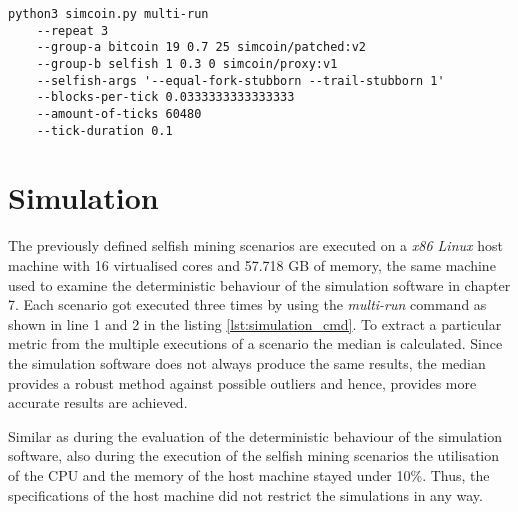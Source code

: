 \begin{minipage}{\linewidth}
\begin{lstlisting}[caption=Command to execute a particular selfish mining scenario, label={lst:simulation_cmd}, basicstyle=\ttfamily, captionpos=b]
python3 simcoin.py multi-run 
	--repeat 3 
	--group-a bitcoin 19 0.7 25 simcoin/patched:v2 
	--group-b selfish 1 0.3 0 simcoin/proxy:v1 
	--selfish-args '--equal-fork-stubborn --trail-stubborn 1' 
	--blocks-per-tick 0.0333333333333333 
	--amount-of-ticks 60480 
	--tick-duration 0.1
\end{lstlisting}
\end{minipage}

\section{Simulation}

The previously defined selfish mining scenarios are executed on a \textit{x86 Linux} host machine with 16 virtualised cores and 57.718 GB of memory, the same machine used to examine the deterministic behaviour of the simulation software in chapter 7.
Each scenario got executed three times by using the \textit{multi-run} command as shown in line 1 and 2 in the listing \ref{lst:simulation_cmd}.
To extract a particular metric from the multiple executions of a scenario the median is calculated.
Since the simulation software does not always produce the same results, the median provides a robust method against possible outliers and hence, provides more accurate results are achieved.

Similar as during the evaluation of the deterministic behaviour of the simulation software, also during the execution of the selfish mining scenarios the utilisation of the CPU and the memory of the host machine stayed under 10\%.
Thus, the specifications of the host machine did not restrict the simulations in any way.
